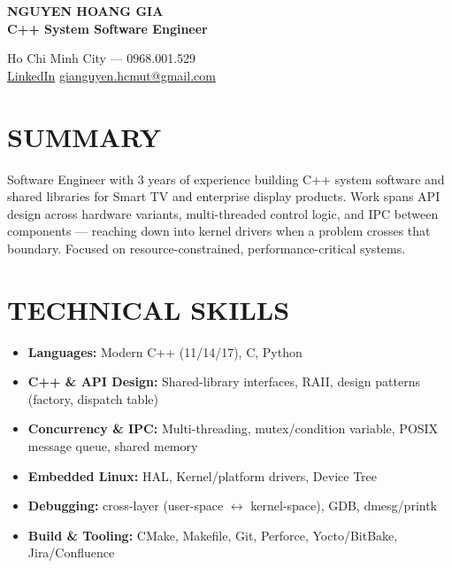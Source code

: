 \documentclass[a4paper,10pt]{article}
\begin{document}
\pagestyle{empty}

\begin{minipage}[t]{0.55\textwidth}
    {\LARGE \textbf{NGUYEN HOANG GIA}} \\[5pt]
    {\large \textbf{C++ System Software Engineer}}
\end{minipage}%
\begin{minipage}[t]{0.45\textwidth}
    \raggedleft
    \vspace{2pt}
    Ho Chi Minh City --- 0968.001.529 \\
    \href{https://www.linkedin.com/in/gia-nguyen-6a007b294/}{LinkedIn} \textbar{} \href{mailto:gianguyen.hcmut@gmail.com}{gianguyen.hcmut@gmail.com}
\end{minipage}

\vspace{4pt}

\section*{SUMMARY}
Software Engineer with 3 years of experience building C++ system software and shared libraries for Smart TV and
enterprise display products. Work spans API design across hardware variants, multi-threaded control logic, and
IPC between components --- reaching down into kernel drivers when a problem crosses that boundary. Focused on
resource-constrained, performance-critical systems.

\section*{TECHNICAL SKILLS}
\begin{itemize}
    \item \textbf{Languages:} Modern C++ (11/14/17), C, Python
    \item \textbf{C++ \& API Design:} Shared-library interfaces, RAII, design patterns (factory, dispatch table)
    \item \textbf{Concurrency \& IPC:} Multi-threading, mutex/condition variable,
    POSIX message queue, shared memory
    \item \textbf{Embedded Linux:} HAL, Kernel/platform drivers, Device Tree
    \item \textbf{Debugging:} cross-layer (user-space $\leftrightarrow$ kernel-space), GDB, dmesg/printk
    \item \textbf{Build \& Tooling:} CMake, Makefile, Git, Perforce, Yocto/BitBake, Jira/Confluence
\end{itemize}
\end{document}
